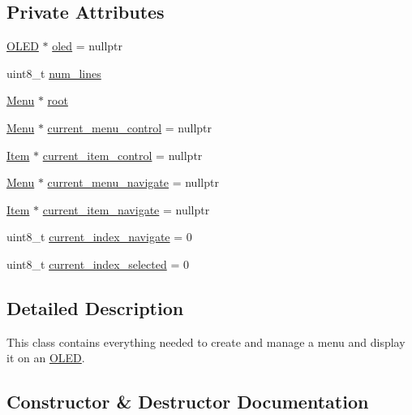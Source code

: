 \subsection*{Private Attributes}
\begin{DoxyCompactItemize}
\item 
\hyperlink{class_o_l_e_d}{O\+L\+ED} $\ast$ \hyperlink{class_menu_1_1_controller_aaa0388123d9e3bb0d4f546336e2b502d}{oled} = nullptr
\item 
uint8\+\_\+t \hyperlink{class_menu_1_1_controller_a80d614a66d1ffa2612688776842f1f31}{num\+\_\+lines}
\item 
\hyperlink{struct_menu_1_1_menu}{Menu} $\ast$ \hyperlink{class_menu_1_1_controller_a211b6de05f7eed25f3a7f504c42316e0}{root}
\item 
\hyperlink{struct_menu_1_1_menu}{Menu} $\ast$ \hyperlink{class_menu_1_1_controller_a912ad4ad6b2c30e7cddf44547585a909}{current\+\_\+menu\+\_\+control} = nullptr
\item 
\hyperlink{struct_menu_1_1_item}{Item} $\ast$ \hyperlink{class_menu_1_1_controller_a288e26b1efe4fd953b5514de72a1c508}{current\+\_\+item\+\_\+control} = nullptr
\item 
\hyperlink{struct_menu_1_1_menu}{Menu} $\ast$ \hyperlink{class_menu_1_1_controller_a66ffabf19a4423ccca536762f0b9df88}{current\+\_\+menu\+\_\+navigate} = nullptr
\item 
\hyperlink{struct_menu_1_1_item}{Item} $\ast$ \hyperlink{class_menu_1_1_controller_a6dfb1678cc8fd44570806ff680ac27cf}{current\+\_\+item\+\_\+navigate} = nullptr
\item 
uint8\+\_\+t \hyperlink{class_menu_1_1_controller_a86055b66afbad89c5a0b8a0a1713f9d3}{current\+\_\+index\+\_\+navigate} = 0
\item 
uint8\+\_\+t \hyperlink{class_menu_1_1_controller_ab3bdee08f22d55f8fa0cb9e29bb27d66}{current\+\_\+index\+\_\+selected} = 0
\end{DoxyCompactItemize}


\subsection{Detailed Description}
This class contains everything needed to create and manage a menu and display it on an \hyperlink{class_o_l_e_d}{O\+L\+ED}. 

\subsection{Constructor \& Destructor Documentation}
\hypertarget{class_menu_1_1_controller_afcbda47e43a9753875631f0d4106f604}{}\label{class_menu_1_1_controller_afcbda47e43a9753875631f0d4106f604} 
